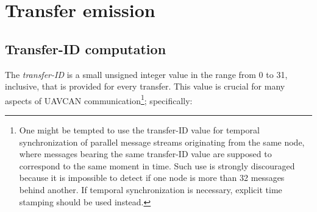 \section{Transfer emission}

\subsection{Transfer-ID computation}\label{sec:transfer_id}

The \emph{transfer-ID} is a small unsigned integer value in the range from 0 to 31, inclusive,
that is provided for every transfer.
This value is crucial for many aspects of UAVCAN communication\footnote{One might be tempted to use the transfer-ID
value for temporal synchronization of parallel message streams originating from the same node,
where messages bearing the same transfer-ID value are supposed to correspond to the same moment in time.
Such use is strongly discouraged because it is impossible to detect if one node is more than
32 messages behind another.
If temporal synchronization is necessary, explicit time stamping should be used instead.};
specifically:
